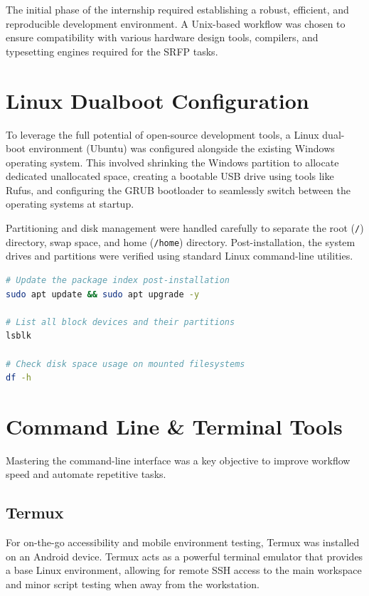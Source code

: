 \documentclass[12pt, a4paper]{report}
\begin{document}
The initial phase of the internship required establishing a robust, efficient, and reproducible development environment. A Unix-based workflow was chosen to ensure compatibility with various hardware design tools, compilers, and typesetting engines required for the SRFP tasks.

\section{Linux Dualboot Configuration}
To leverage the full potential of open-source development tools, a Linux dual-boot environment (Ubuntu) was configured alongside the existing Windows operating system. This involved shrinking the Windows partition to allocate dedicated unallocated space, creating a bootable USB drive using tools like Rufus, and configuring the GRUB bootloader to seamlessly switch between the operating systems at startup.

Partitioning and disk management were handled carefully to separate the root (\texttt{/}) directory, swap space, and home (\texttt{/home}) directory. Post-installation, the system drives and partitions were verified using standard Linux command-line utilities.

\begin{lstlisting}[language=bash, caption=Useful Disk Management Commands]
# Update the package index post-installation
sudo apt update && sudo apt upgrade -y

# List all block devices and their partitions
lsblk

# Check disk space usage on mounted filesystems
df -h
\end{lstlisting}

\section{Command Line \& Terminal Tools}
Mastering the command-line interface was a key objective to improve workflow speed and automate repetitive tasks.

\subsection{Termux}
For on-the-go accessibility and mobile environment testing, Termux was installed on an Android device. Termux acts as a powerful terminal emulator that provides a base Linux environment, allowing for remote SSH access to the main workspace and minor script testing when away from the workstation.
\end{document}
